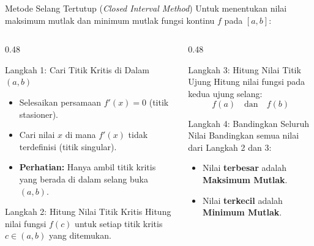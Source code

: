 \documentclass[aspectratio=169,10pt]{beamer}
\begin{document}
\begin{frame}{Metode Selang Tertutup (\textit{Closed Interval Method})}
    Untuk menentukan nilai maksimum mutlak dan minimum mutlak fungsi kontinu $f$ pada $[a, b]$:

    \vspace{0.15cm}
    \begin{columns}[T]
        \begin{column}{0.48\textwidth}
            \begin{block}{Langkah 1: Cari Titik Kritis di Dalam $(a, b)$}
                \begin{itemize}
                    \item Selesaikan persamaan $f'(x) = 0$ (titik stasioner).
                    \item Cari nilai $x$ di mana $f'(x)$ tidak terdefinisi (titik singular).
                    \item \textbf{Perhatian:} Hanya ambil titik kritis yang berada di dalam selang buka $(a, b)$.
                \end{itemize}
            \end{block}

            \begin{block}{Langkah 2: Hitung Nilai Titik Kritis}
                Hitung nilai fungsi $f(c)$ untuk setiap titik kritis $c \in (a, b)$ yang ditemukan.
            \end{block}
        \end{column}

        \begin{column}{0.48\textwidth}
            \begin{block}{Langkah 3: Hitung Nilai Titik Ujung}
                Hitung nilai fungsi pada kedua ujung selang:
                \[
                    f(a) \quad \text{dan} \quad f(b)
                \]
            \end{block}

            \begin{alertblock}{Langkah 4: Bandingkan Seluruh Nilai}
                Bandingkan semua nilai dari Langkah 2 dan 3:
                \begin{itemize}
                    \item Nilai \textbf{terbesar} adalah \textbf{Maksimum Mutlak}.
                    \item Nilai \textbf{terkecil} adalah \textbf{Minimum Mutlak}.
                \end{itemize}
            \end{alertblock}
        \end{column}
    \end{columns}
\end{frame}
\end{document}
